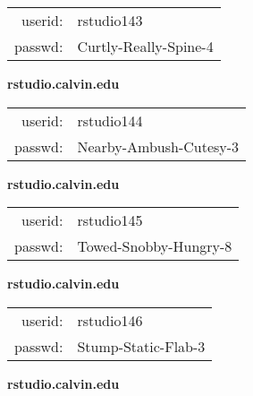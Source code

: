 \documentclass{article}\usepackage[]{graphicx}\usepackage[]{color}
\begin{document}
\begin{multicols}{3}
\begin{minipage}{.3\textwidth}
\begin{tabular}{rl}
userid: & rstudio143\\
passwd: & Curtly-Really-Spine-4

\vspace{5mm}

\end{tabular}\end{minipage}

\vspace{5mm}

\begin{minipage}{.3\textwidth}
\centerline{\textbf{rstudio.calvin.edu}}
\medskip
\begin{tabular}{rl}

userid: & rstudio144\\
passwd: & Nearby-Ambush-Cutesy-3

\vspace{5mm}

\end{tabular}\end{minipage}

\vspace{5mm}

\begin{minipage}{.3\textwidth}
\centerline{\textbf{rstudio.calvin.edu}}
\medskip
\begin{tabular}{rl}

userid: & rstudio145\\
passwd: & Towed-Snobby-Hungry-8

\vspace{5mm}

\end{tabular}\end{minipage}

\vspace{5mm}

\begin{minipage}{.3\textwidth}
\centerline{\textbf{rstudio.calvin.edu}}
\medskip
\begin{tabular}{rl}

userid: & rstudio146\\
passwd: & Stump-Static-Flab-3

\vspace{5mm}

\end{tabular}\end{minipage}

\vspace{5mm}

\begin{minipage}{.3\textwidth}
\centerline{\textbf{rstudio.calvin.edu}}
\medskip
\begin{tabular}{rl}


\end{tabular}
\end{minipage}
\end{multicols}
\end{document}
